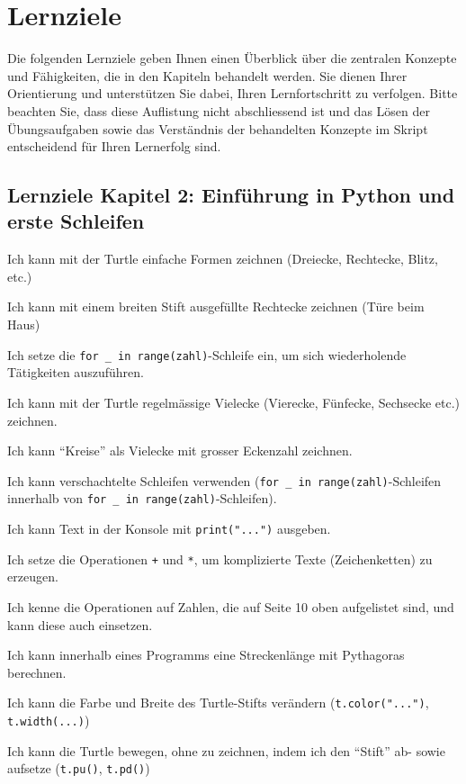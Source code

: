 \chapter{Lernziele}

Die folgenden Lernziele geben Ihnen einen Überblick über die zentralen Konzepte und Fähigkeiten, die in den Kapiteln behandelt werden. Sie dienen Ihrer Orientierung und unterstützen Sie dabei, Ihren Lernfortschritt zu verfolgen. Bitte beachten Sie, dass diese Auflistung nicht abschliessend ist und das Lösen der Übungsaufgaben sowie das Verständnis der behandelten Konzepte im Skript entscheidend für Ihren Lernerfolg sind.

\section*{Lernziele Kapitel 2: Einführung in Python und erste Schleifen}
\begin{todolist}
    \item Ich kann mit der Turtle einfache Formen zeichnen (Dreiecke, Rechtecke, Blitz, etc.)
    \item Ich kann mit einem breiten Stift ausgefüllte Rechtecke zeichnen (Türe beim Haus)
    \item Ich setze die \lstinline|for _ in range(zahl)|-Schleife ein, um sich wiederholende Tätigkeiten auszuführen.
    \item Ich kann mit der Turtle regelmässige Vielecke (Vierecke, Fünfecke, Sechsecke etc.) zeichnen.
    \item Ich kann \enquote{Kreise} als Vielecke mit grosser Eckenzahl zeichnen.
    \item Ich kann verschachtelte Schleifen verwenden (\lstinline|for _ in range(zahl)|-Schleifen innerhalb von \lstinline|for _ in range(zahl)|-Schleifen).
    \item Ich kann Text in der Konsole mit \lstinline|print("...")| ausgeben.
    \item Ich setze die Operationen \lstinline|+| und \lstinline|*|, um komplizierte Texte (Zeichenketten) zu erzeugen.
    \item Ich kenne die Operationen auf Zahlen, die auf Seite 10 oben aufgelistet sind, und kann diese auch einsetzen.
    \item Ich kann innerhalb eines Programms eine Streckenlänge mit Pythagoras berechnen.
    \item Ich kann die Farbe und Breite des Turtle-Stifts verändern (\lstinline|t.color("...")|, \lstinline|t.width(...)|)
    \item Ich kann die Turtle bewegen, ohne zu zeichnen, indem ich den \enquote{Stift} ab- sowie aufsetze (\lstinline|t.pu()|, \lstinline|t.pd()|)
\end{todolist}
